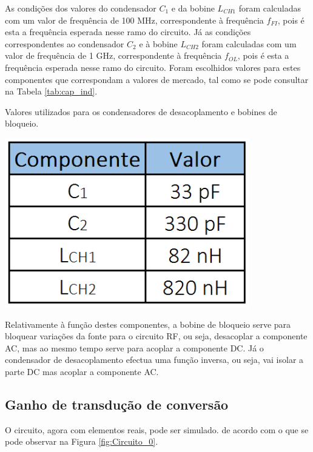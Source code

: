 \documentclass[11pt]{article}
\numberwithin{equation}{section}
\begin{document}
\vspace{2mm}
As condições dos valores do condensador $ C_{1} $ e da bobine $ L_{CH1} $ foram calculadas com um valor de frequência de 100 MHz, correspondente à frequência $f_{FI}$, pois é esta a frequência esperada nesse ramo do circuito. Já as condições correspondentes ao condensador $ C_{2} $ e à bobine $ L_{CH2} $ foram calculadas com um valor de frequência de 1 GHz, correspondente à frequência $ f_{OL} $, pois é esta a frequência esperada nesse ramo do circuito. Foram escolhidos valores para estes componentes que correspondam a valores de mercado, tal como se pode consultar	 na Tabela \ref{tab:cap_ind}.

\begin{table}[h]
	\centering
	\caption{Valores utilizados para os condensadores de desacoplamento e bobines de bloqueio.}
	\vspace{-1.5mm}
	\includegraphics[keepaspectratio=true, scale=0.37]{teoricas/componentes}
	\label{tab:cap_ind}
\end{table}

Relativamente à função destes componentes, a bobine de bloqueio serve para bloquear variações da fonte para o circuito RF, ou seja, desacoplar a componente AC, mas ao mesmo tempo serve para acoplar a componente DC. Já o condensador de desacoplamento efectua uma função inversa, ou seja, vai isolar a parte DC mas acoplar a componente AC.

\subsection{Ganho de transdução de conversão}  

O circuito, agora com elementos reais, pode ser simulado. de acordo com o que se pode observar na Figura \ref{fig:Circuito_0}.
\end{document}
